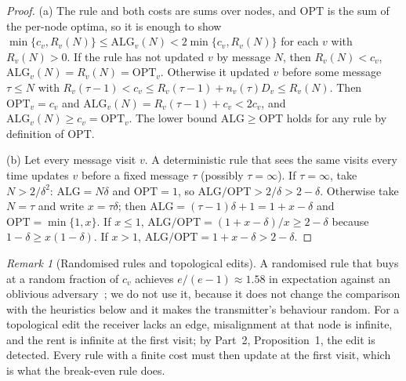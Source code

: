 \documentclass[11pt]{article}
\theoremstyle{definition}
\theoremstyle{remark}
\newtheorem{remark}{Remark}
\newcommand{\ALG}{\mathrm{ALG}}
\newcommand{\OPT}{\mathrm{OPT}}
\begin{document}
\begin{proof}
(a) The rule and both costs are sums over nodes, and $\OPT$ is the sum of the per-node optima, so it is enough to show $\min\{c_v,R_v(N)\}\le\ALG_v(N)<2\min\{c_v,R_v(N)\}$ for each $v$ with $R_v(N)>0$. If the rule has not updated $v$ by message $N$, then $R_v(N)<c_v$, $\ALG_v(N)=R_v(N)=\OPT_v$. Otherwise it updated $v$ before some message $\tau\le N$ with $R_v(\tau-1)<c_v\le R_v(\tau-1)+n_v(\tau)D_v\le R_v(N)$. Then $\OPT_v=c_v$ and $\ALG_v(N)=R_v(\tau-1)+c_v<2c_v$, and $\ALG_v(N)\ge c_v=\OPT_v$. The lower bound $\ALG\ge\OPT$ holds for any rule by definition of $\OPT$.

(b) Let every message visit $v$. A deterministic rule that sees the same visits every time updates $v$ before a fixed message $\tau$ (possibly $\tau=\infty$). If $\tau=\infty$, take $N>2/\delta^{2}$: $\ALG=N\delta$ and $\OPT=1$, so $\ALG/\OPT>2/\delta>2-\delta$. Otherwise take $N=\tau$ and write $x=\tau\delta$; then $\ALG=(\tau-1)\delta+1=1+x-\delta$ and $\OPT=\min\{1,x\}$. If $x\le1$, $\ALG/\OPT=(1+x-\delta)/x\ge2-\delta$ because $1-\delta\ge x(1-\delta)$. If $x>1$, $\ALG/\OPT=1+x-\delta>2-\delta$.
\end{proof}

\begin{remark}[Randomised rules and topological edits]\label{rem:rand}
A randomised rule that buys at a random fraction of $c_v$ achieves $e/(e-1)\approx1.58$ in expectation against an oblivious adversary~\cite{karlin1994}; we do not use it, because it does not change the comparison with the heuristics below and it makes the transmitter's behaviour random. For a topological edit the receiver lacks an edge, misalignment at that node is infinite, and the rent is infinite at the first visit; by Part~2, Proposition~1, the edit is detected. Every rule with a finite cost must then update at the first visit, which is what the break-even rule does.
\end{remark}
\end{document}
